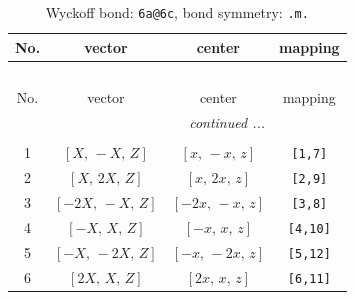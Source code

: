 \documentclass[fleqn,8pt]{jsarticle}
\begin{document}
\begin{longtable}{cccc}
\caption{Wyckoff bond: {\tt 6a@6c}, bond symmetry: {\tt .m.}}
 \\
 \hline \hline
No. & vector & center & mapping \\ \hline \endfirsthead

\multicolumn{3}{l}{\tablename\ \thetable{}} \\
 \hline \hline
No. & vector & center & mapping \\ \hline \endhead

 \hline \hline
\multicolumn{3}{r}{\footnotesize\it continued ...} \\ \endfoot

 \hline \hline
\multicolumn{3}{r}{} \\ \endlastfoot

1 & $\left[ X,\, - X,\, Z \right]$ & $\left[ x,\, - x,\, z \right]$ & {\tt [1,7]} \\ \hline
2 & $\left[ X,\, 2 X,\, Z \right]$ & $\left[ x,\, 2 x,\, z \right]$ & {\tt [2,9]} \\ \hline
3 & $\left[ - 2 X,\, - X,\, Z \right]$ & $\left[ - 2 x,\, - x,\, z \right]$ & {\tt [3,8]} \\ \hline
4 & $\left[ - X,\, X,\, Z \right]$ & $\left[ - x,\, x,\, z \right]$ & {\tt [4,10]} \\ \hline
5 & $\left[ - X,\, - 2 X,\, Z \right]$ & $\left[ - x,\, - 2 x,\, z \right]$ & {\tt [5,12]} \\ \hline
6 & $\left[ 2 X,\, X,\, Z \right]$ & $\left[ 2 x,\, x,\, z \right]$ & {\tt [6,11]} \\
\end{longtable}
\renewcommand{\arraystretch}{1.2}
\end{document}
